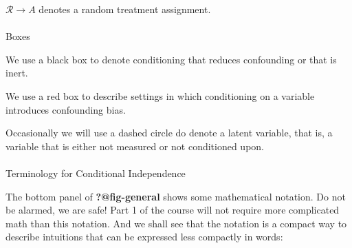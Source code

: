 \documentclass[
  single column]{article}
\makeatletter
\let\oldparagraph\paragraph
\renewcommand{\paragraph}{
    \@ifstar
      \xxxParagraphStar
      \xxxParagraphNoStar
  }
\newcommand{\xxxParagraphStar}[1]{\oldparagraph*{#1}\mbox{}}
\newcommand{\xxxParagraphNoStar}[1]{\oldparagraph{#1}\mbox{}}
\makeatother
\begin{document}
\(\mathcal{R}\to A\) denotes a random treatment assignment.

\paragraph{Boxes}\label{boxes}

We use a black box to denote conditioning that reduces confounding or
that is inert.

We use a red box to describe settings in which conditioning on a
variable introduces confounding bias.

Occasionally we will use a dashed circle do denote a latent variable,
that is, a variable that is either not measured or not conditioned upon.

\paragraph{Terminology for Conditional
Independence}\label{terminology-for-conditional-independence}

The bottom panel of \textbf{?@fig-general} shows some mathematical
notation. Do not be alarmed, we are safe! Part 1 of the course will not
require more complicated math than this notation. And we shall see that
the notation is a compact way to describe intuitions that can be
expressed less compactly in words:
\end{document}
